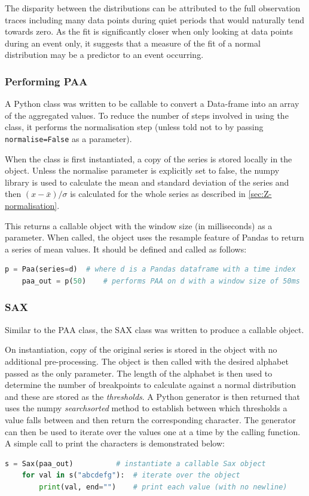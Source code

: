 \documentclass[../report.tex]{subfiles}
\begin{document}
	The disparity between the distributions can be attributed to the full observation traces including many data points during quiet periods that would naturally tend towards zero.  As the fit is significantly closer when only looking at data points during an event only, it suggests that a measure of the fit of a normal distribution may be a predictor to an event occurring.

\subsubsection{Performing PAA}
	A Python class was written to be callable to convert a Data-frame into an array of the aggregated values.  To reduce the number of steps involved in using the class, it performs the normalisation step (unless told not to by passing \verb|normalise=False| as a parameter).
	
	
	
	When the class is first instantiated, a copy of the series is stored locally in the object.  Unless the normalise parameter is explicitly set to false, the numpy library is used to calculate the mean and standard deviation of the series and then $(x - \bar{x}) / \sigma$ is calculated for the whole series as described in \cref{sec:Z-normalisation}.
	
	This returns a callable object with the window size (in milliseconds) as a parameter.  When called, the object uses the resample feature of Pandas to return a series of mean values.	It should be defined and called as follows:
	
\begin{lstlisting}[language=Python]
	p = Paa(series=d)  # where d is a Pandas dataframe with a time index
	paa_out = p(50)    # performs PAA on d with a window size of 50ms
\end{lstlisting}

\subsubsection{SAX}
	Similar to the PAA class, the SAX class was written to produce a callable object.

	
	
	On instantiation, copy of the original series is stored in the object with no additional pre-processing.  The object is then called with the desired alphabet passed as the only parameter.  The length of the alphabet is then used to determine the number of breakpoints to calculate against a normal distribution and these are stored as the \textit{thresholds}.  A Python generator is then returned that uses the numpy \textit{searchsorted} method to establish between which thresholds a value falls between and then return the corresponding character.  The generator can then be used to iterate over the values one at a time by the calling function.  A simple call to print the characters is demonstrated below:
	
\begin{lstlisting}[language=Python]
	s = Sax(paa_out)          # instantiate a callable Sax object
	for val in s("abcdefg"):  # iterate over the object
	    print(val, end="")    # print each value (with no newline)
\end{lstlisting}
	
\end{document}
